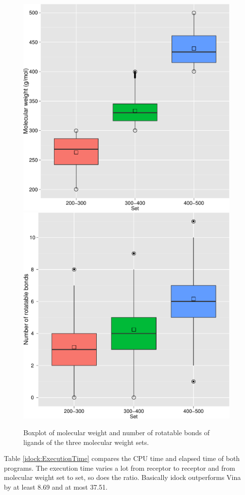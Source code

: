 \begin{figure}
\centering
\subfloat
{
  \includegraphics[width=0.485\linewidth]{idock/MWT.pdf}
}
\subfloat
{
  \includegraphics[width=0.485\linewidth]{idock/NRB.pdf}
}
\caption{Boxplot of molecular weight and number of rotatable bonds of ligands of the three molecular weight sets.}
\label{idock:MWT-NRB}
\end{figure}

Table \ref{idock:ExecutionTime} compares the CPU time and elapsed time of both programs. The execution time varies a lot from receptor to receptor and from molecular weight set to set, so does the ratio. Basically idock outperforms Vina by at least 8.69 and at most 37.51.

